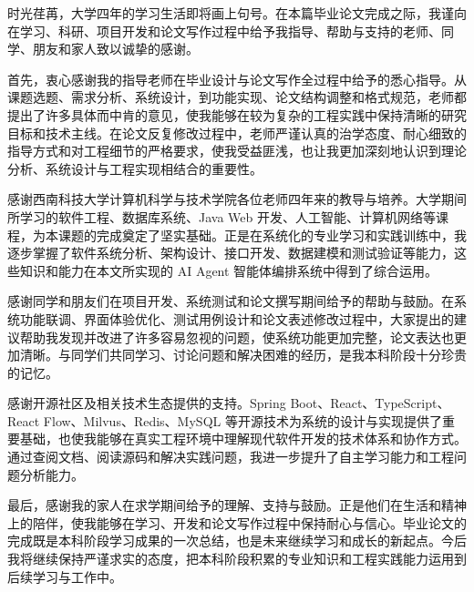 
\acknowledgement

时光荏苒，大学四年的学习生活即将画上句号。在本篇毕业论文完成之际，我谨向在学习、科研、项目开发和论文写作过程中给予我指导、帮助与支持的老师、同学、朋友和家人致以诚挚的感谢。

首先，衷心感谢我的指导老师在毕业设计与论文写作全过程中给予的悉心指导。从课题选题、需求分析、系统设计，到功能实现、论文结构调整和格式规范，老师都提出了许多具体而中肯的意见，使我能够在较为复杂的工程实践中保持清晰的研究目标和技术主线。在论文反复修改过程中，老师严谨认真的治学态度、耐心细致的指导方式和对工程细节的严格要求，使我受益匪浅，也让我更加深刻地认识到理论分析、系统设计与工程实现相结合的重要性。

感谢西南科技大学计算机科学与技术学院各位老师四年来的教导与培养。大学期间所学习的软件工程、数据库系统、Java Web 开发、人工智能、计算机网络等课程，为本课题的完成奠定了坚实基础。正是在系统化的专业学习和实践训练中，我逐步掌握了软件系统分析、架构设计、接口开发、数据建模和测试验证等能力，这些知识和能力在本文所实现的 AI Agent 智能体编排系统中得到了综合运用。

感谢同学和朋友们在项目开发、系统测试和论文撰写期间给予的帮助与鼓励。在系统功能联调、界面体验优化、测试用例设计和论文表述修改过程中，大家提出的建议帮助我发现并改进了许多容易忽视的问题，使系统功能更加完整，论文表达也更加清晰。与同学们共同学习、讨论问题和解决困难的经历，是我本科阶段十分珍贵的记忆。

感谢开源社区及相关技术生态提供的支持。Spring Boot、React、TypeScript、React Flow、Milvus、Redis、MySQL 等开源技术为系统的设计与实现提供了重要基础，也使我能够在真实工程环境中理解现代软件开发的技术体系和协作方式。通过查阅文档、阅读源码和解决实践问题，我进一步提升了自主学习能力和工程问题分析能力。

最后，感谢我的家人在求学期间给予的理解、支持与鼓励。正是他们在生活和精神上的陪伴，使我能够在学习、开发和论文写作过程中保持耐心与信心。毕业论文的完成既是本科阶段学习成果的一次总结，也是未来继续学习和成长的新起点。今后我将继续保持严谨求实的态度，把本科阶段积累的专业知识和工程实践能力运用到后续学习与工作中。

